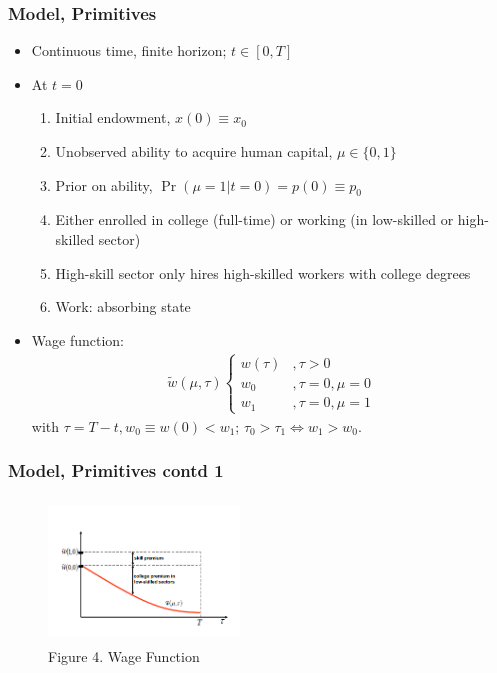 \begin{frame}
	\frametitle{Model, Primitives}
		\begin{itemize}
			\item Continuous time, finite horizon; $t \in [0,T]$
			\item At $t=0$
				\begin{enumerate}
					\item Initial endowment, $x(0) \equiv x_{0}$
					\item Unobserved ability to acquire human capital, $\mu \in \{0,1\}$
					\item Prior on ability, $\Pr(\mu = 1 | t = 0) = p(0) \equiv p_{0}$
					\item Either enrolled in college (full-time) or working (in low-skilled or high-skilled sector)
					\item High-skill sector only hires high-skilled workers with college degrees
					\item Work: absorbing state
				\end{enumerate}
					\item Wage function:
						\begin{eqnarray}
							\tilde{w} \left( \mu, \tau \right)
							\begin{cases}
								w(\tau) &,  \tau > 0 \\
								w_{0}    &,  \tau = 0, \mu = 0 \\
								w_{1}   &,  \tau = 0, \mu = 1 
							\end{cases} 
						\end{eqnarray}
\noindent with $\tau = T - t, w_{0} \equiv w(0) < w_{1}$; $\tau_{0} > \tau_{1} \Leftrightarrow w_{1} > w_{0}$. 
		\end{itemize}
\end{frame}

\begin{frame}
	\frametitle{Model, Primitives contd 1}
		\begin{figure}[H] 
		\caption*{Figure 4. Wage Function}
		\centering
		\includegraphics[width=2in, height=1.5in]{Figures/OT/figure4.png}
		\end{figure}
\end{frame}

